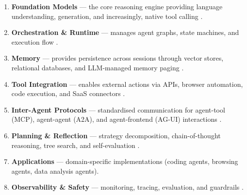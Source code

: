 \documentclass[review,authoryear]{elsarticle}
\theoremstyle{definition}
\begin{document}
\begin{enumerate}
    \item[\textbf{L1.}] \textbf{Foundation Models} --- the core reasoning engine providing language understanding, generation, and increasingly, native tool calling \citep{openai2024gpt4o,anthropic2024claude,team2023gemini}.
    \item[\textbf{L2.}] \textbf{Orchestration \& Runtime} --- manages agent graphs, state machines, and execution flow \citep{langchain2024langgraph,wu2023autogen,hong2023metagpt}.
    \item[\textbf{L3.}] \textbf{Memory} --- provides persistence across sessions through vector stores, relational databases, and LLM-managed memory paging \citep{packer2023memgpt,lewis2020retrieval}.
    \item[\textbf{L4.}] \textbf{Tool Integration} --- enables external actions via APIs, browser automation, code execution, and SaaS connectors \citep{schick2024toolformer,patil2023gorilla}.
    \item[\textbf{L5.}] \textbf{Inter-Agent Protocols} --- standardised communication for agent-tool (MCP), agent-agent (A2A), and agent-frontend (AG-UI) interactions \citep{anthropic2024mcp,google2024a2a,copilotkit2024agui}.
    \item[\textbf{L6.}] \textbf{Planning \& Reflection} --- strategy decomposition, chain-of-thought reasoning, tree search, and self-evaluation \citep{wei2022chain,yao2024tree,shinn2023reflexion}.
    \item[\textbf{L7.}] \textbf{Applications} --- domain-specific implementations (coding agents, browsing agents, data analysis agents).
    \item[\textbf{L8.}] \textbf{Observability \& Safety} --- monitoring, tracing, evaluation, and guardrails \citep{langfuse2024,guardrailsai2024}.
\end{enumerate}
\end{document}
